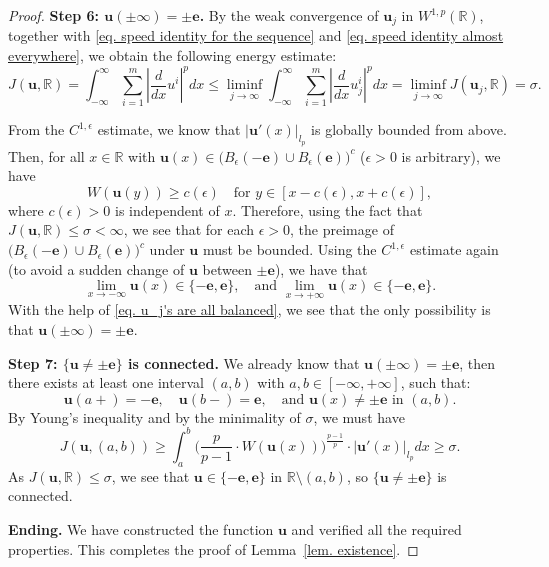 \documentclass[11pt,twoside,reqno]{amsart}
\numberwithin{equation}{section}
\begin{document}
\begin{proof}
    


    \textbf{Step 6: $\mathbf{u}(\pm\infty)=\pm\mathbf{e}$.} 
    By the weak convergence of $\mathbf{u}_j$ in $W^{1,p}(\mathbb{R})$,
together with \eqref{eq. speed identity for the sequence} and
\eqref{eq. speed identity almost everywhere}, we obtain the following
energy estimate:
    \begin{equation*}
        J(\mathbf{u},\mathbb{R})=\int_{-\infty}^{\infty}\sum_{i=1}^{m}|\frac{d}{dx}u^{i}|^{p}dx\leq\liminf_{j\to\infty}\int_{-\infty}^{\infty}\sum_{i=1}^{m}|\frac{d}{dx}u_{j}^{i}|^{p}dx=\liminf_{j\to\infty}J(\mathbf{u}_{j},\mathbb{R})=\sigma.
    \end{equation*}
    
    From the $C^{1,\epsilon}$ estimate, we know that $|\mathbf{u}'(x)|_{l_{p}}$ is globally bounded from above. Then, for all $x\in\mathbb{R}$ with $\mathbf{u}(x)\in\Big(B_{\epsilon}(-\mathbf{e})\cup B_{\epsilon}(\mathbf{e})\Big)^{c}$ ($\epsilon>0$ is arbitrary), we have 
    \[
W(\mathbf{u}(y))\geq c(\epsilon)
\quad\mbox{for }y\in[x-c(\epsilon),x+c(\epsilon)],
\]
 where $c(\epsilon)>0$ is independent of $x$. Therefore, using the fact that $J(\mathbf{u},\mathbb{R})\leq\sigma<\infty$, we see that for each $\epsilon>0$, the preimage of $\Big(B_{\epsilon}(-\mathbf{e})\cup B_{\epsilon}(\mathbf{e})\Big)^{c}$ under $\mathbf{u}$ must be bounded. Using the $C^{1,\epsilon}$ estimate again (to avoid a sudden change of $\mathbf{u}$ between $\pm\mathbf{e}$), we have that
    \begin{equation*}
        \lim_{x\to-\infty}\mathbf{u}(x)\in\{-\mathbf{e},\mathbf{e}\},\quad\mbox{and }\lim_{x\to+\infty}\mathbf{u}(x)\in\{-\mathbf{e},\mathbf{e}\}.
    \end{equation*}
    With the help of \eqref{eq. u_j's are all balanced}, we see that the only possibility is that $\mathbf{u}(\pm\infty)=\pm\mathbf{e}$.

    \textbf{Step 7: $\{\mathbf{u}\neq\pm\mathbf{e}\}$ is connected.} We already know that $\mathbf{u}(\pm\infty)=\pm\mathbf{e}$, then there exists at least one interval $(a,b)$ with $a,b\in[-\infty,+\infty]$, such that:
    \begin{equation*}
        \mathbf{u}(a+)=-\mathbf{e},\quad\mathbf{u}(b-)=\mathbf{e},\quad\mbox{and }\mathbf{u}(x)\neq\pm\mathbf{e}\mbox{ in }(a,b).
    \end{equation*}
    By Young's inequality and by the minimality of $\sigma$, we must have
    \begin{equation*}
        J(\mathbf{u},(a,b))\geq\int_{a}^{b}\Big(\frac{p}{p-1}\cdot W(\mathbf{u}(x))\Big)^{\frac{p-1}{p}}\cdot|\mathbf{u}'(x)|_{l_{p}}dx\geq\sigma.
    \end{equation*}
    As $J(\mathbf{u},\mathbb{R})\leq\sigma$, we see that $\mathbf{u}\in\{-\mathbf{e},\mathbf{e}\}$ in $\mathbb{R}\setminus(a,b)$, so $\{\mathbf{u}\neq\pm\mathbf{e}\}$ is connected.

    \textbf{Ending.} We have constructed the function $\mathbf{u}$ and verified all the
required properties. This completes the proof of
Lemma~\ref{lem. existence}.
\end{proof}
\end{document}

